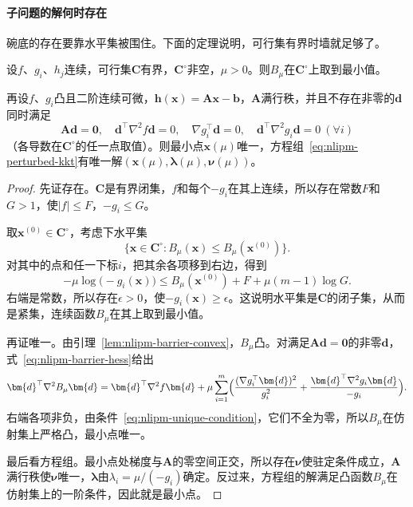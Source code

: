 \paragraph{子问题的解何时存在}
碗底的存在要靠水平集被围住。下面的定理说明，可行集有界时墙就足够了。

\begin{theorem}[障碍子问题的解]
\label{thm:nlipm-barrier-exists}
设$f$、$g_i$、$h_j$连续，可行集$\bm{C}$有界，$\bm{C}^{\circ}$非空，$\mu>0$。则$B_\mu$在$\bm{C}^{\circ}$上取到最小值。

再设$f$、$g_i$凸且二阶连续可微，$\bm{h}(\bm{x})=\bm{A}\bm{x}-\bm{b}$，$\bm{A}$满行秩，并且不存在非零的$\bm{d}$同时满足
\begin{equation}
 \bm{A}\bm{d}=\bm{0},\quad\bm{d}^\top\nabla^2f\bm{d}=0,\quad\nabla g_i^\top\bm{d}=0,\quad\bm{d}^\top\nabla^2g_i\bm{d}=0\ (\forall i)
 \label{eq:nlipm-unique-condition}
\end{equation}
（各导数在$\bm{C}^{\circ}$的任一点取值）。则最小点$\bm{x}(\mu)$唯一，方程组~\eqref{eq:nlipm-perturbed-kkt}有唯一解$(\bm{x}(\mu),\bm{\lambda}(\mu),\bm{\nu}(\mu))$。
\end{theorem}

\begin{proof}
先证存在。$\bm{C}$是有界闭集，$f$和每个$-g_i$在其上连续，所以存在常数$F$和$G>1$，使$\lvert f\rvert\leq F$，$-g_i\leq G$。

取$\bm{x}^{(0)}\in\bm{C}^{\circ}$，考虑下水平集
\[
 \bigl\{\bm{x}\in\bm{C}^{\circ}:B_\mu(\bm{x})\leq B_\mu(\bm{x}^{(0)})\bigr\}.
\]
对其中的点和任一下标$i$，把其余各项移到右边，得到
\[
 -\mu\log\bigl(-g_i(\bm{x})\bigr)\leq B_\mu(\bm{x}^{(0)})+F+\mu(m-1)\log G.
\]
右端是常数，所以存在$\epsilon>0$，使$-g_i(\bm{x})\geq\epsilon$。这说明水平集是$\bm{C}$的闭子集，从而是紧集，连续函数$B_\mu$在其上取到最小值。

再证唯一。由引理~\ref{lem:nlipm-barrier-convex}，$B_\mu$凸。对满足$\bm{A}\bm{d}=\bm{0}$的非零$\bm{d}$，式~\eqref{eq:nlipm-barrier-hess}给出
\[
 \bm{d}^\top\nabla^2B_\mu\bm{d}=\bm{d}^\top\nabla^2f\bm{d}+\mu\sum_{i=1}^m\Bigl(\frac{(\nabla g_i^\top\bm{d})^2}{g_i^2}+\frac{\bm{d}^\top\nabla^2g_i\bm{d}}{-g_i}\Bigr).
\]
右端各项非负，由条件~\eqref{eq:nlipm-unique-condition}，它们不全为零，所以$B_\mu$在仿射集上严格凸，最小点唯一。

最后看方程组。最小点处梯度与$\bm{A}$的零空间正交，所以存在$\bm{\nu}$使驻定条件成立，$\bm{A}$满行秩使$\bm{\nu}$唯一，$\bm{\lambda}$由$\lambda_i=\mu/(-g_i)$确定。反过来，方程组的解满足凸函数$B_\mu$在仿射集上的一阶条件，因此就是最小点。
\end{proof}

